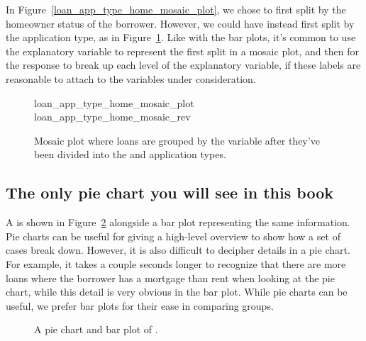 In Figure~\ref{loan_app_type_home_mosaic_plot},
we chose to first split by the homeowner status
of the borrower.
However, we could have instead first split by
the application type, as in
Figure~\ref{loan_app_type_home_mosaic_rev}.
Like with the bar plots, it's common to use
the explanatory variable to represent the
first split in a mosaic plot,
and then for the response to break
up each level of the explanatory variable,
if these labels are reasonable to attach to
the variables under consideration.

\begin{figure}[h]
  \centering
      {loan_app_type_home_mosaic_plot}
      {loan_app_type_home_mosaic_rev}
  \caption{Mosaic plot where loans are grouped by
      the  variable after they've
      been divided into the  and
       application types.}
  \label{loan_app_type_home_mosaic_rev}
\end{figure}



\subsection{The only pie chart you will see in this book}

A  is shown in
Figure~\ref{loan_homeownership_pie_chart} alongside
a bar plot representing the same information.
Pie charts can be useful for giving a high-level overview
to show how a set of cases break down.
However, it is also difficult to decipher details
in a pie chart.
For example, it takes a couple seconds longer to recognize
that there are more loans where the borrower has
a mortgage than rent when looking at the pie chart,
while this detail is very obvious in the bar plot.
While pie charts can be useful, we prefer bar plots
for their ease in comparing groups.

\begin{figure}[h]
  \centering
  \caption{A pie chart and bar plot of .}
  \label{loan_homeownership_pie_chart}
\end{figure}

